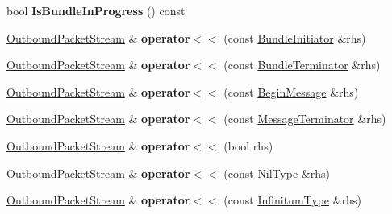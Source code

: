 \begin{DoxyCompactItemize}
bool {\bfseries Is\+Bundle\+In\+Progress} () const
\item 
\mbox{\label{classosc_1_1_outbound_packet_stream_af664359b307f80c9159d9f1b7fc8a8df}} 
\hyperlink{classosc_1_1_outbound_packet_stream}{Outbound\+Packet\+Stream} \& {\bfseries operator$<$$<$} (const \hyperlink{structosc_1_1_bundle_initiator}{Bundle\+Initiator} \&rhs)
\item 
\mbox{\label{classosc_1_1_outbound_packet_stream_afb1ae9919cb4f6cc915afa0e5b1a9b4e}} 
\hyperlink{classosc_1_1_outbound_packet_stream}{Outbound\+Packet\+Stream} \& {\bfseries operator$<$$<$} (const \hyperlink{structosc_1_1_bundle_terminator}{Bundle\+Terminator} \&rhs)
\item 
\mbox{\label{classosc_1_1_outbound_packet_stream_a70568cf72d659fc8a1d4bc9e7fff2b20}} 
\hyperlink{classosc_1_1_outbound_packet_stream}{Outbound\+Packet\+Stream} \& {\bfseries operator$<$$<$} (const \hyperlink{structosc_1_1_begin_message}{Begin\+Message} \&rhs)
\item 
\mbox{\label{classosc_1_1_outbound_packet_stream_a3717b68b63a6e9a7b885be0a9b821ebe}} 
\hyperlink{classosc_1_1_outbound_packet_stream}{Outbound\+Packet\+Stream} \& {\bfseries operator$<$$<$} (const \hyperlink{structosc_1_1_message_terminator}{Message\+Terminator} \&rhs)
\item 
\mbox{\label{classosc_1_1_outbound_packet_stream_ae0bd84a08b799d6082a5b694fe8df7e9}} 
\hyperlink{classosc_1_1_outbound_packet_stream}{Outbound\+Packet\+Stream} \& {\bfseries operator$<$$<$} (bool rhs)
\item 
\mbox{\label{classosc_1_1_outbound_packet_stream_ad1953729e5a5d5c27c50dc3c3981b56f}} 
\hyperlink{classosc_1_1_outbound_packet_stream}{Outbound\+Packet\+Stream} \& {\bfseries operator$<$$<$} (const \hyperlink{structosc_1_1_nil_type}{Nil\+Type} \&rhs)
\item 
\mbox{\label{classosc_1_1_outbound_packet_stream_a1ad22e32da894b404b86e4b6558ae06b}} 
\hyperlink{classosc_1_1_outbound_packet_stream}{Outbound\+Packet\+Stream} \& {\bfseries operator$<$$<$} (const \hyperlink{structosc_1_1_infinitum_type}{Infinitum\+Type} \&rhs)

\end{DoxyCompactItemize}
